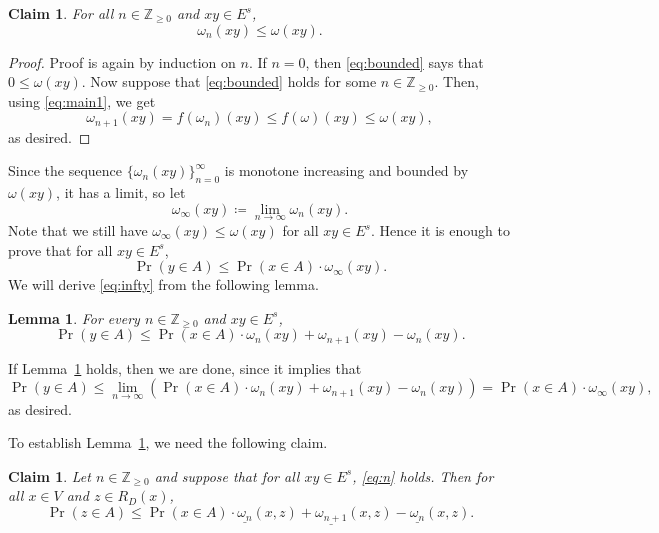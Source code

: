 \documentclass[10pt]{article}
\numberwithin{equation}{subsection}
\newtheorem{lemma}[theo]{Lemma}
\newtheorem{claim}[theo]{Claim}
\theoremstyle{definition}
\begin{document}
	\begin{claim}
		For all $n \in \mathbb{Z}_{\geq 0}$ and $xy \in E^s$,
		\begin{equation}\label{eq:bounded}
		\omega_n(xy) \leq \omega(xy).
		\end{equation}
	\end{claim}
	\begin{proof}
		Proof is again by induction on $n$. If $n = 0$, then \eqref{eq:bounded} says that $0 \leq \omega(xy)$. Now suppose that \eqref{eq:bounded} holds for some $n \in \mathbb{Z}_{\geq 0}$. Then, using \eqref{eq:main1}, we get
		$$
		\omega_{n+1}(xy) = f(\omega_n)(xy) \leq f(\omega)(xy) \leq \omega(xy),
		$$
		as desired.
	\end{proof}
	
	Since the sequence $\{\omega_n(xy)\}_{n =0}^\infty$ is monotone increasing and bounded by $\omega(xy)$, it has a limit, so let
	$$
	\omega_\infty(xy) \coloneqq\lim_{n \to \infty} \omega_n(xy).
	$$
	Note that we still have $\omega_\infty(xy) \leq \omega(xy)$ for all $xy \in E^s$. Hence it is enough to prove that for all $xy \in E^s$,
	\begin{equation}\label{eq:infty}
	\Pr(y \in A) \leq \Pr(x \in A) \cdot \omega_\infty(xy).
	\end{equation}
	We will derive \eqref{eq:infty} from the following lemma.
	
	\begin{lemma}\label{lemma:n}
		For every $n \in \mathbb{Z}_{\geq 0}$ and $xy \in E^s$,
		\begin{equation}\label{eq:n}
		\Pr(y \in A) \leq \Pr(x \in A) \cdot \omega_n(xy) + \omega_{n+1}(xy)-\omega_n(xy).
		\end{equation}
	\end{lemma}
	
	If Lemma~\ref{lemma:n} holds, then we are done, since it implies that
	$$
	\Pr(y \in A) \leq \lim_{n \to \infty} \left(\Pr(x \in A) \cdot \omega_n(xy) + \omega_{n+1}(xy)-\omega_n(xy)\right) = \Pr(x \in A) \cdot \omega_\infty(xy),
	$$
	as desired.
	
	To establish Lemma~\ref{lemma:n}, we need the following claim.
	
	\begin{claim}\label{claim:generalizedn}
		Let $n \in \mathbb{Z}_{\geq 0}$ and suppose that for all $xy \in E^s$, \eqref{eq:n} holds. Then for all $x \in V$ and $z \in R_D(x)$,
		\begin{equation}\label{eq:generalizedn}
		\Pr(z \in A) \leq \Pr(x \in A) \cdot \underline{\omega_n}(x,z) + \underline{\omega_{n+1}}(x,z)-\underline{\omega_n}(x,z).
		\end{equation}
	\end{claim}
	
\end{document}
